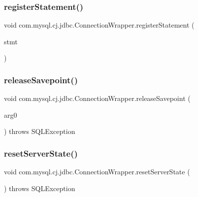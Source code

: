 \subsubsection{\texorpdfstring{register\+Statement()}{registerStatement()}}
{\footnotesize\ttfamily void com.\+mysql.\+cj.\+jdbc.\+Connection\+Wrapper.\+register\+Statement (\begin{DoxyParamCaption}\item[{\mbox{\hyperlink{interfacecom_1_1mysql_1_1cj_1_1jdbc_1_1_jdbc_statement}{com.\+mysql.\+cj.\+jdbc.\+Jdbc\+Statement}}}]{stmt }\end{DoxyParamCaption})}

\mbox{\label{classcom_1_1mysql_1_1cj_1_1jdbc_1_1_connection_wrapper_a9d10ffe3fb8bf01464f4ef55c1eb936d}} 
\subsubsection{\texorpdfstring{release\+Savepoint()}{releaseSavepoint()}}
{\footnotesize\ttfamily void com.\+mysql.\+cj.\+jdbc.\+Connection\+Wrapper.\+release\+Savepoint (\begin{DoxyParamCaption}\item[{Savepoint}]{arg0 }\end{DoxyParamCaption}) throws S\+Q\+L\+Exception}

\mbox{\label{classcom_1_1mysql_1_1cj_1_1jdbc_1_1_connection_wrapper_a420204849914ad076e502ba7753ba6b5}} 
\subsubsection{\texorpdfstring{reset\+Server\+State()}{resetServerState()}}
{\footnotesize\ttfamily void com.\+mysql.\+cj.\+jdbc.\+Connection\+Wrapper.\+reset\+Server\+State (\begin{DoxyParamCaption}{ }\end{DoxyParamCaption}) throws S\+Q\+L\+Exception}

